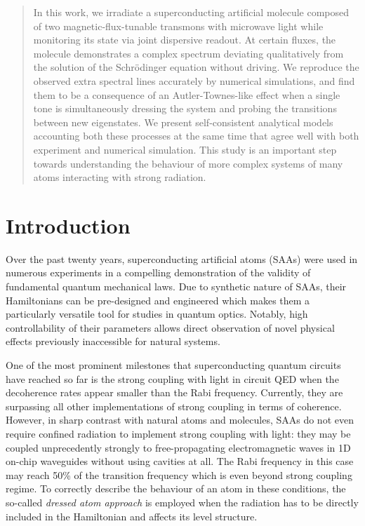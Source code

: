 \documentclass[%
 pra,
 amsmath,amssymb,
 reprint,%
]{revtex4-1}
\begin{document}
	
	\begin{abstract}
	In this work, we irradiate a superconducting 
	artificial molecule composed of two 
	magnetic-flux-tunable transmons with 
	microwave light while monitoring its state 
	via joint dispersive readout. At certain 
	fluxes, the molecule demonstrates a complex 
	spectrum deviating qualitatively from the 
	solution of the Schrödinger equation without 
	driving. We reproduce the observed extra 
	spectral lines accurately by numerical 
	simulations, and find them to be a 
	consequence of an Autler-Townes-like effect 
	when a single tone is simultaneously dressing 
	the system and probing the transitions 
	between new eigenstates. We present 
	self-consistent analytical models accounting 
	both these processes at the same time that 
	agree well with both experiment and numerical 
	simulation. This study is an important step 
	towards understanding the behaviour of more 
	complex systems of many atoms interacting 
	with strong radiation.
	\end{abstract}
	
	\maketitle
\section{Introduction}





Over the past twenty years, superconducting 
artificial atoms (SAAs) were used in numerous 
experiments in a compelling demonstration of the 
validity of fundamental quantum mechanical 
laws\cite{you2011atomic}. Due to synthetic nature 
of SAAs, their Hamiltonians can be pre-designed 
and engineered which makes them a particularly 
versatile tool for studies in quantum optics. 
Notably, high controllability of their parameters 
allows direct observation of novel physical 
effects previously inaccessible for natural 
systems. 

One of the most prominent milestones that 
superconducting quantum circuits have reached so 
far is the strong coupling with light in {circuit 
QED}\cite{wallraff2004strong, 
chiorescu2004coherent} when the decoherence rates 
appear smaller than the Rabi frequency. 
Currently, they are surpassing all other 
implementations of strong coupling in terms of 
coherence\cite{forn2019ultrastrong}. 
However, in sharp contrast with natural atoms and 
molecules, SAAs do not even require confined 
radiation to implement strong coupling with 
light: they may be coupled unprecedently strongly 
to free-propagating electromagnetic waves in 1D 
on-chip waveguides\cite{astafiev2010resonance} 
without using cavities at all. The Rabi frequency 
in this case may reach 50\% of the transition 
frequency\cite{deng2015observation} which is even 
beyond strong coupling 
regime\cite{forn2019ultrastrong}. To correctly 
describe the behaviour of an atom in these 
conditions, the so-called \textit{dressed atom 
approach}\cite{cohen1998atom} is employed when 
the radiation has to be directly included in the 
Hamiltonian and affects its level structure.
\end{document}
